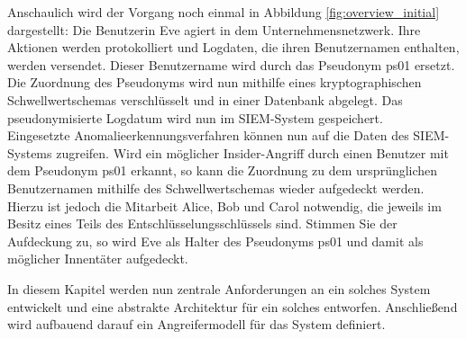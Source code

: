 Anschaulich wird der Vorgang noch einmal in Abbildung \ref{fig:overview_initial} dargestellt: Die Benutzerin Eve agiert in dem Unternehmensnetzwerk. Ihre Aktionen werden protokolliert und Logdaten, die ihren Benutzernamen enthalten, werden versendet. Dieser Benutzername wird durch das Pseudonym ps01 ersetzt. Die Zuordnung des Pseudonyms wird nun mithilfe eines kryptographischen Schwellwertschemas verschlüsselt und in einer Datenbank abgelegt. Das pseudonymisierte Logdatum wird nun im SIEM-System gespeichert.\\
Eingesetzte Anomalieerkennungsverfahren können nun auf die Daten des SIEM-Systems zugreifen. Wird ein möglicher Insider-Angriff durch einen Benutzer mit dem Pseudonym ps01 erkannt, so kann die Zuordnung zu dem ursprünglichen Benutzernamen mithilfe des Schwellwertschemas wieder aufgedeckt werden. Hierzu ist jedoch die Mitarbeit Alice, Bob und Carol notwendig, die jeweils im Besitz eines Teils des Entschlüsselungsschlüssels sind. Stimmen Sie der Aufdeckung zu, so wird Eve als Halter des Pseudonyms ps01 und damit als möglicher Innentäter aufgedeckt.

In diesem Kapitel werden nun zentrale Anforderungen an ein solches System entwickelt und eine abstrakte Architektur für ein solches entworfen. Anschließend wird aufbauend darauf ein Angreifermodell für das System definiert.






